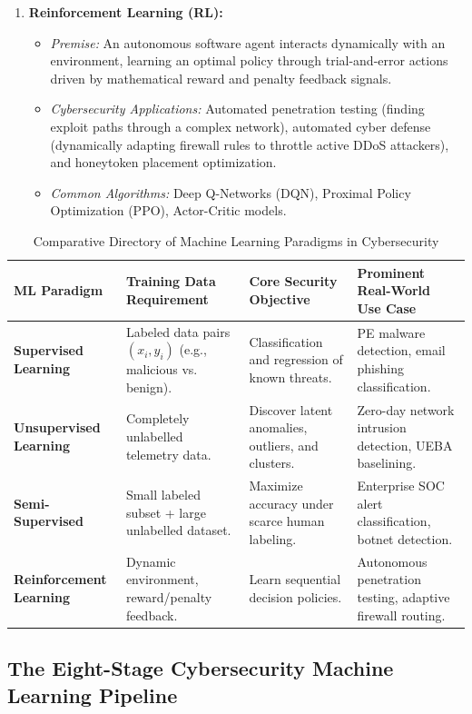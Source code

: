 \begin{enumerate}
\item \textbf{Reinforcement Learning (RL):}
\begin{itemize}
\item \textit{Premise:} An autonomous software agent interacts dynamically with an environment, learning an optimal policy through trial-and-error actions driven by mathematical reward and penalty feedback signals.
\item \textit{Cybersecurity Applications:} Automated penetration testing (finding exploit paths through a complex network), automated cyber defense (dynamically adapting firewall rules to throttle active DDoS attackers), and honeytoken placement optimization.
\item \textit{Common Algorithms:} Deep Q-Networks (DQN), Proximal Policy Optimization (PPO), Actor-Critic models.
\end{itemize}
\end{enumerate}

\begin{table}[htbp]
\centering
\caption{Comparative Directory of Machine Learning Paradigms in Cybersecurity}
\label{tab:ml_paradigms}
\begin{tabularx}{\textwidth}{p{3.2cm} p{3.5cm} X X}
\toprule
\textbf{ML Paradigm} & \textbf{Training Data Requirement} & \textbf{Core Security Objective} & \textbf{Prominent Real-World Use Case} \\
\midrule
\textbf{Supervised Learning} & Labeled data pairs $(x_i, y_i)$ (e.g., malicious vs. benign). & Classification and regression of known threats. & PE malware detection, email phishing classification. \\
\textbf{Unsupervised Learning} & Completely unlabelled telemetry data. & Discover latent anomalies, outliers, and clusters. & Zero-day network intrusion detection, UEBA baselining. \\
\textbf{Semi-Supervised} & Small labeled subset + large unlabelled dataset. & Maximize accuracy under scarce human labeling. & Enterprise SOC alert classification, botnet detection. \\
\textbf{Reinforcement Learning} & Dynamic environment, reward/penalty feedback. & Learn sequential decision policies. & Autonomous penetration testing, adaptive firewall routing. \\
\bottomrule
\end{tabularx}
\end{table}

\subsection{The Eight-Stage Cybersecurity Machine Learning Pipeline}

